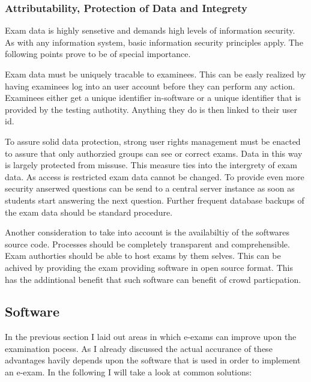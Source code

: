 \hypertarget{attributability-protection-of-data-and-integrety}{%
\subsubsection{Attributability, Protection of Data and
Integrety}\label{attributability-protection-of-data-and-integrety}}

Exam data is highly sensetive and demands high levels of information
security. As with any information system, basic information security
principles apply. The following points prove to be of special
importance.

Exam data must be uniquely tracable to examinees. This can be easly
realized by having examinees log into an user account before they can
perform any action. Examinees either get a unique identifier in-software
or a unique identifier that is provided by the testing authotity.
Anything they do is then linked to their user id.

To assure solid data protection, strong user rights management must be
enacted to assure that only authorzied groups can see or correct exams.
Data in this way is largely protected from missuse. This measure ties
into the intergrety of exam data. As access is restricted exam data
cannot be changed. To provide even more security anserwed questions can
be send to a central server instance as soon as students start answering
the next question. Further frequent database backups of the exam data
should be standard procedure.

Another consideration to take into account is the availabiltiy of the
softwares source code. Processes should be completely transparent and
comprehensible. Exam authorties should be able to host exams by them
selves. This can be achived by providing the exam providing software in
open source format. This has the addintional benefit that such software
can benefit of crowd particpation.

\hypertarget{software}{%
\subsection{Software}\label{software}}

In the previous section I laid out areas in which e-exams can improve
upon the examination pocess. As I already discussed the actual accurance
of these advantages havily depends upon the software that is used in
order to implement an e-exam. In the following I will take a look at
common solutions:

